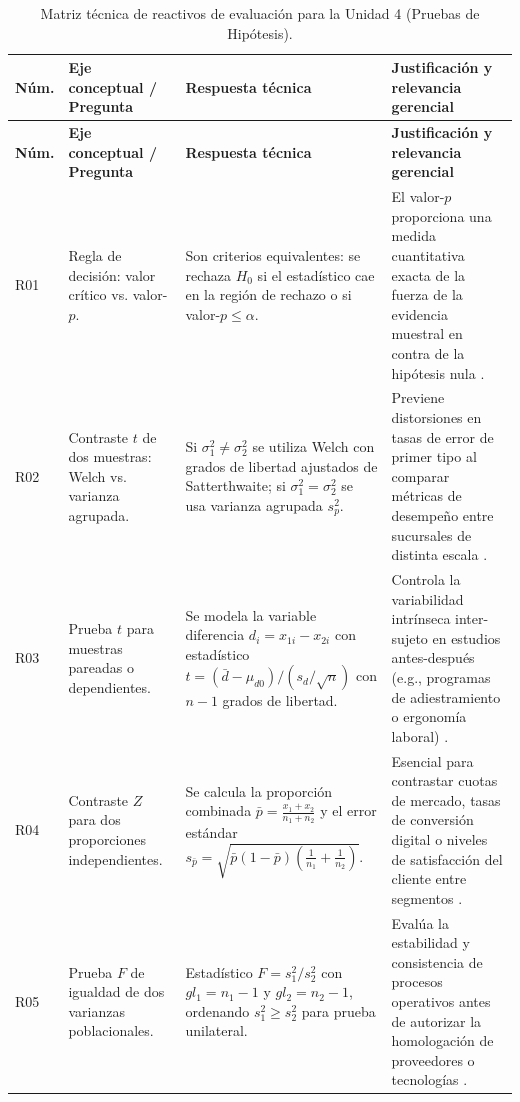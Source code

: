 {\begin{center}
\renewcommand{\arraystretch}{1.3}
\begin{longtable}{p{1.1cm}p{4.2cm}p{4.0cm}p{5.2cm}}
\caption{Matriz técnica de reactivos de evaluación para la Unidad 4 (Pruebas de Hipótesis).}\label{tab:cuestionario_u4}\\
\toprule
\textbf{Núm.} & \textbf{Eje conceptual / Pregunta} & \textbf{Respuesta técnica} & \textbf{Justificación y relevancia gerencial} \\
\midrule
\endfirsthead
\toprule
\textbf{Núm.} & \textbf{Eje conceptual / Pregunta} & \textbf{Respuesta técnica} & \textbf{Justificación y relevancia gerencial} \\
\midrule
\endhead
\bottomrule
\endfoot
R01 & Regla de decisión: valor crítico vs. valor-$p$. & Son criterios equivalentes: se rechaza $H_0$ si el estadístico cae en la región de rechazo o si valor-$p \le \alpha$. & El valor-$p$ proporciona una medida cuantitativa exacta de la fuerza de la evidencia muestral en contra de la hipótesis nula \citep{anderson2012}. \\
\midrule
R02 & Contraste $t$ de dos muestras: Welch vs. varianza agrupada. & Si $\sigma_1^2 \ne \sigma_2^2$ se utiliza Welch con grados de libertad ajustados de Satterthwaite; si $\sigma_1^2 = \sigma_2^2$ se usa varianza agrupada $s_p^2$. & Previene distorsiones en tasas de error de primer tipo al comparar métricas de desempeño entre sucursales de distinta escala \citep{wackerly2010}. \\
\midrule
R03 & Prueba $t$ para muestras pareadas o dependientes. & Se modela la variable diferencia $d_i = x_{1i} - x_{2i}$ con estadístico $t = (\bar{d} - \mu_{d0})/(s_d/\sqrt{n})$ con $n-1$ grados de libertad. & Controla la variabilidad intrínseca inter-sujeto en estudios antes-después (e.g., programas de adiestramiento o ergonomía laboral) \citep{lind2012}. \\
\midrule
R04 & Contraste $Z$ para dos proporciones independientes. & Se calcula la proporción combinada $\bar{p} = \frac{x_1 + x_2}{n_1 + n_2}$ y el error estándar $s_{\bar{p}} = \sqrt{\bar{p}(1-\bar{p})\left(\frac{1}{n_1} + \frac{1}{n_2}\right)}$. & Esencial para contrastar cuotas de mercado, tasas de conversión digital o niveles de satisfacción del cliente entre segmentos \citep{holmesBusiness2023}. \\
\midrule
R05 & Prueba $F$ de igualdad de dos varianzas poblacionales. & Estadístico $F = s_1^2 / s_2^2$ con $gl_1 = n_1-1$ y $gl_2 = n_2-1$, ordenando $s_1^2 \ge s_2^2$ para prueba unilateral. & Evalúa la estabilidad y consistencia de procesos operativos antes de autorizar la homologación de proveedores o tecnologías \citep{canavos1988}. \\

\end{longtable}
\end{center}}
